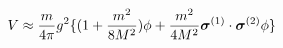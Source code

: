 \begin{equation}
V \approx \frac{m}{4 \pi}  g^{2} \{ ( 1 + \frac{m^{2}}{8M^{2}}) \phi
+ \frac{m^{2}}{4M^{2}}  \mbox{\boldmath $\sigma$}^{(1)} \cdot 
\mbox{\boldmath $\sigma$}^{(2)} \phi \}
\end{equation}

